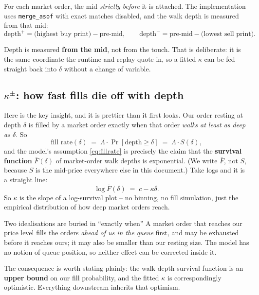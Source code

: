 \documentclass[11pt,a4paper]{article}
\newcommand{\code}[1]{\texttt{\small #1}}
\begin{document}
For each market order, the mid \emph{strictly before} it is attached. The
implementation uses \code{merge\_asof} with exact matches disabled, and the walk
depth is measured from that mid:
\[
  \text{depth}^{+} = \text{(highest buy print)} - \text{pre-mid},
  \qquad
  \text{depth}^{-} = \text{pre-mid} - \text{(lowest sell print)} .
\]

\begin{intuition}
Depth is measured \textbf{from the mid}, not from the touch. That is deliberate:
it is the same coordinate the runtime and replay quote in, so a fitted $\kappa$ can be
fed straight back into $\delta$ without a change of variable.
\end{intuition}

\subsection{\texorpdfstring{$\kappa^{\pm}$}{kappa}: how fast fills die off with depth}

Here is the key insight, and it is prettier than it first looks. Our order
resting at depth $\delta$ is filled by a market order exactly when that order
\emph{walks at least as deep as $\delta$}. So
\[
  \text{fill rate}(\delta) \;=\; \Lambda\cdot\Pr[\text{depth} \ge \delta]
  \;=\; \Lambda\cdot S(\delta),
\]
and the model's assumption \eqref{eq:fillrate} is precisely the claim that the
\textbf{survival function} $\bar{F}(\delta)$ of market-order walk depths is
exponential. (We write $\bar F$, not $S$, because $S$ is the mid-price everywhere
else in this document.) Take logs and it is a straight line:
\[
  \log \bar{F}(\delta) \;=\; c - \kappa\delta .
\]
So $\kappa$ is the slope of a log-survival plot -- no binning, no fill
simulation, just the empirical distribution of how deep market orders reach.

\begin{trap}{Two idealisations are buried in ``exactly when''}
A market order that reaches our price level fills the orders \emph{ahead of us in
the queue} first, and may be exhausted before it reaches ours; it may also be
smaller than our resting size. The model has no notion of queue position, so
neither effect can be corrected inside it.

The consequence is worth stating plainly: the walk-depth survival function is an
\textbf{upper bound} on our fill probability, and the fitted $\kappa$ is
correspondingly optimistic. Everything downstream inherits that optimism.
\end{trap}
\end{document}
